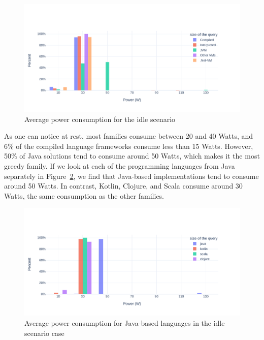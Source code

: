 \begin{figure}[!h]
    \centering
    \includegraphics[width=1.0\columnwidth]{imgs/av_power_idle}
    \caption{Average power consumption for the idle scenario}
    \label{fig:av_power_idle}
\end{figure}

As one can notice at rest, most families consume between 20 and 40 Watts, and 6\% of the compiled language frameworks consume less than 15 Watts.
However, 50\% of Java solutions tend to consume around 50 Watts, which makes it the most greedy family.
If we look at each of the programming languages from Java separately in Figure~\ref{fig:av_power_java_idle}, we find that Java-based implementations tend to consume around 50 Watts. In contrast, Kotlin, Clojure, and Scala consume around 30 Watts, the same consumption as the other families.

\begin{figure}[!h]
    \centering
    \includegraphics[width=1.0\columnwidth]{imgs/av_power_java_idle}
    \caption{Average power consumption for Java-based languages in the idle scenario case}
    \label{fig:av_power_java_idle}
\end{figure}

